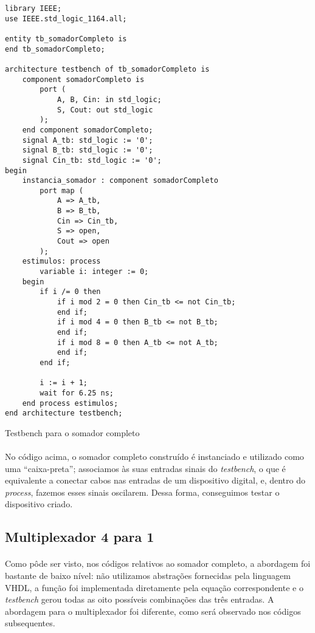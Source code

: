 \documentclass[a4paper,12pt]{article}
\newenvironment{code}{\captionsetup{type=listing}}{}
\begin{document}
\begin{code}
\begin{verbatim}
library IEEE;
use IEEE.std_logic_1164.all;

entity tb_somadorCompleto is
end tb_somadorCompleto;

architecture testbench of tb_somadorCompleto is
    component somadorCompleto is
        port (
            A, B, Cin: in std_logic;
            S, Cout: out std_logic
        );
    end component somadorCompleto;
    signal A_tb: std_logic := '0';
    signal B_tb: std_logic := '0';
    signal Cin_tb: std_logic := '0';
begin
    instancia_somador : component somadorCompleto 
        port map (
            A => A_tb,
            B => B_tb,
            Cin => Cin_tb,
            S => open,
            Cout => open
        );
    estimulos: process
        variable i: integer := 0;
    begin
        if i /= 0 then
            if i mod 2 = 0 then Cin_tb <= not Cin_tb;
            end if;
            if i mod 4 = 0 then B_tb <= not B_tb;
            end if;
            if i mod 8 = 0 then A_tb <= not A_tb;
            end if;
        end if;

        i := i + 1;
        wait for 6.25 ns;
    end process estimulos;
end architecture testbench;
\end{verbatim}
\caption{Testbench para o somador completo}
\end{code}

\paragraph{}
No código acima, o somador completo construído é instanciado e utilizado como uma ``caixa-preta''; associamos às suas entradas sinais do \textit{testbench}, o que é equivalente a conectar cabos nas entradas de um dispositivo digital, e, dentro do \textit{process}, fazemos esses sinais oscilarem. Dessa forma, conseguimos testar o dispositivo criado.

\subsection{Multiplexador 4 para 1}
\paragraph{}
Como pôde ser visto, nos códigos relativos ao somador completo, a abordagem foi bastante de baixo nível: não utilizamos abstrações fornecidas pela linguagem VHDL, a função foi implementada diretamente pela equação correspondente e o \textit{testbench} gerou todas as oito possíveis combinações das três entradas. A abordagem para o multiplexador foi diferente, como será observado nos códigos subsequentes.
\end{document}
